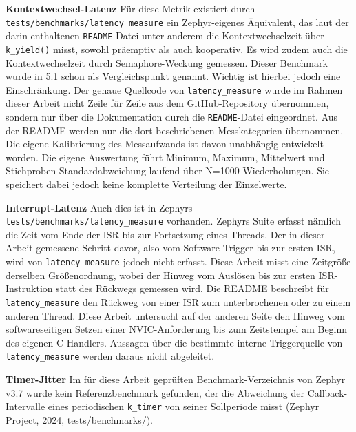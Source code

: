 \textbf{Kontextwechsel-Latenz }F{\"u}r diese Metrik existiert durch \lstinline[style=codeinline]|tests/benchmarks/latency_measure| ein Zephyr-eigenes {\"A}quivalent, das laut der darin enthaltenen \lstinline[style=codeinline]|README|-Datei unter anderem die Kontextwechselzeit {\"u}ber \lstinline[style=codeinline]|k_yield()| misst, sowohl pr{\"a}emptiv als auch kooperativ. Es wird zudem auch die Kontextwechselzeit durch Semaphore-Weckung gemessen. Dieser Benchmark wurde in 5.1 schon als Vergleichspunkt genannt. Wichtig ist hierbei jedoch eine Einschr{\"a}nkung. Der genaue Quellcode von \lstinline[style=codeinline]|latency_measure| wurde im Rahmen dieser Arbeit nicht Zeile f{\"u}r Zeile aus dem GitHub-Repository {\"u}bernommen, sondern nur {\"u}ber die Dokumentation durch die \lstinline[style=codeinline]|README|-Datei eingeordnet. Aus der README werden nur die dort beschriebenen Messkategorien {\"u}bernommen. Die eigene Kalibrierung des Messaufwands ist davon unabh{\"a}ngig entwickelt worden. Die eigene Auswertung f{\"u}hrt Minimum, Maximum, Mittelwert und Stichproben-Standardabweichung laufend {\"u}ber N=1000 Wiederholungen. Sie speichert dabei jedoch keine komplette Verteilung der Einzelwerte.

\textbf{Interrupt-Latenz }Auch dies ist in Zephyrs \lstinline[style=codeinline]|tests/benchmarks/latency_measure| vorhanden. Zephyrs Suite erfasst n{\"a}mlich die Zeit vom Ende der ISR bis zur Fortsetzung eines Threads. Der in dieser Arbeit gemessene Schritt davor, also vom Software-Trigger bis zur ersten ISR, wird von \lstinline[style=codeinline]|latency_measure| jedoch nicht erfasst. Diese Arbeit misst eine Zeitgr{\"o}{\ss}e derselben Gr{\"o}{\ss}enordnung, wobei der Hinweg vom Ausl{\"o}sen bis zur ersten ISR-Instruktion statt des R{\"u}ckwegs gemessen wird. Die README beschreibt f{\"u}r \lstinline[style=codeinline]|latency_measure| den R{\"u}ckweg von einer ISR zum unterbrochenen oder zu einem anderen Thread. Diese Arbeit untersucht auf der anderen Seite den Hinweg vom softwareseitigen Setzen einer NVIC-Anforderung bis zum Zeitstempel am Beginn des eigenen C-Handlers. Aussagen {\"u}ber die bestimmte interne Triggerquelle von \lstinline[style=codeinline]|latency_measure| werden daraus nicht abgeleitet.

\textbf{Timer-Jitter }Im f{\"u}r diese Arbeit gepr{\"u}ften Benchmark-Verzeichnis von Zephyr v3.7 wurde kein Referenzbenchmark gefunden, der die Abweichung der Callback-Intervalle eines periodischen \lstinline[style=codeinline]|k_timer| von seiner Sollperiode misst (Zephyr Project, 2024, tests/benchmarks/).

